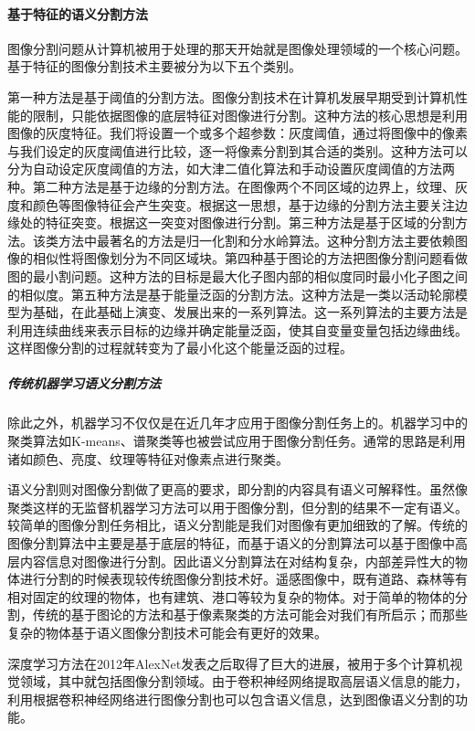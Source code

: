 \paragraph{基于特征的语义分割方法}
图像分割问题从计算机被用于处理的那天开始就是图像处理领域的一个核心问题。基于特征的图像分割技术主要被分为以下五个类别。

第一种方法是基于阈值的分割方法。图像分割技术在计算机发展早期受到计算机性能的限制，只能依据图像的底层特征对图像进行分割。这种方法的核心思想是利用图像的灰度特征。我们将设置一个或多个超参数：灰度阈值，通过将图像中的像素与我们设定的灰度阈值进行比较，逐一将像素分割到其合适的类别。这种方法可以分为自动设定灰度阈值的方法，如大津二值化算法\cite{otsu1979threshold}和手动设置灰度阈值的方法两种。第二种方法是基于边缘的分割方法。在图像两个不同区域的边界上，纹理、灰度和颜色等图像特征会产生突变。根据这一思想，基于边缘的分割方法主要关注边缘处的特征突变。根据这一突变对图像进行分割。第三种方法是基于区域的分割方法。该类方法中最著名的方法是归一化割\cite{shi2000normalized}和分水岭算法\cite{vincent1991watersheds}。这种分割方法主要依赖图像的相似性将图像划分为不同区域块。第四种基于图论的方法把图像分割问题看做图的最小割问题。这种方法的目标是最大化子图内部的相似度同时最小化子图之间的相似度。第五种方法是基于能量泛函的分割方法\cite{lankton2008localizing}。这种方法是一类以活动轮廓模型为基础，在此基础上演变、发展出来的一系列算法。这一系列算法的主要方法是利用连续曲线来表示目标的边缘并确定能量泛函，使其自变量变量包括边缘曲线。这样图像分割的过程就转变为了最小化这个能量泛函的过程。

\subparagraph{传统机器学习语义分割方法}
除此之外，机器学习不仅仅是在近几年才应用于图像分割任务上的。机器学习中的聚类算法如K-means\cite{ray1999determination}、谱聚类\cite{zelnik2005self}等也被尝试应用于图像分割任务。通常的思路是利用诸如颜色、亮度、纹理等特征对像素点进行聚类。

语义分割则对图像分割做了更高的要求，即分割的内容具有语义可解释性。虽然像聚类这样的无监督机器学习方法可以用于图像分割，但分割的结果不一定有语义。较简单的图像分割任务相比，语义分割能是我们对图像有更加细致的了解。传统的图像分割算法中主要是基于底层的特征，而基于语义的分割算法可以基于图像中高层内容信息对图像进行分割。因此语义分割算法在对结构复杂，内部差异性大的物体进行分割的时候表现较传统图像分割技术好。遥感图像中，既有道路、森林等有相对固定的纹理的物体，也有建筑、港口等较为复杂的物体。对于简单的物体的分割，传统的基于图论的方法和基于像素聚类的方法可能会对我们有所启示；而那些复杂的物体基于语义图像分割技术可能会有更好的效果。

深度学习方法在2012年AlexNet\cite{krizhevsky2012imagenet}发表之后取得了巨大的进展，被用于多个计算机视觉领域，其中就包括图像分割领域。由于卷积神经网络提取高层语义信息的能力，利用根据卷积神经网络进行图像分割也可以包含语义信息，达到图像语义分割的功能。

